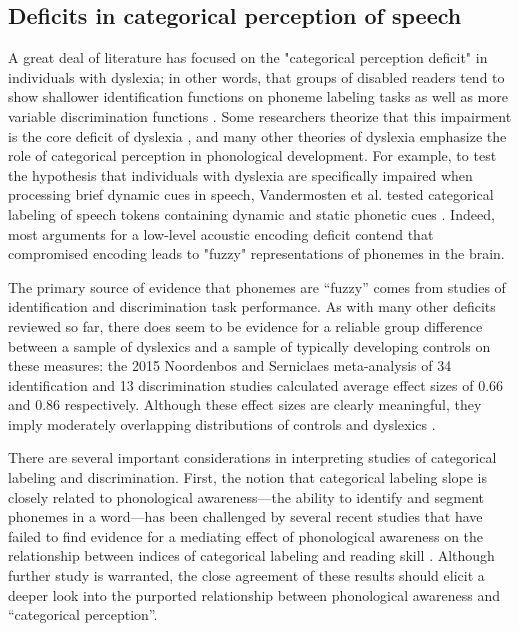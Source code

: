 \documentclass[../uwthesis.tex]{subfiles}
\begin{document}
\subsection{Deficits in categorical perception of speech}
A great deal of literature has focused on the "categorical perception deficit" in individuals with dyslexia; in other words, that groups of disabled readers tend to show shallower identification functions on phoneme labeling tasks as well as more variable discrimination functions \citep{Manis1997,Mody1997,Joanisse2000,Blomert2004,Hakvoort2016,Serniclaes2004}. Some researchers theorize that this impairment is the core deficit of dyslexia \citep{Serniclaes2001}, and many other theories of dyslexia emphasize the role of categorical perception in phonological development. For example, to test the hypothesis that individuals with dyslexia are specifically impaired when processing brief dynamic cues in speech, Vandermosten et al. tested categorical labeling of speech tokens containing dynamic and static phonetic cues \citep{Vandermosten2010,Vandermosten2011}. Indeed, most arguments for a low-level acoustic encoding deficit contend that compromised encoding leads to "fuzzy" representations of phonemes in the brain. 

The primary source of evidence that phonemes are “fuzzy” comes from studies of
identification and discrimination task performance. As with many other deficits reviewed so
far, there does seem to be evidence for a reliable group difference between a sample of
dyslexics and a sample of typically developing controls on these measures: the 2015
Noordenbos and Serniclaes meta-analysis of 34 identification and 13 discrimination studies calculated average effect sizes of 0.66 and 0.86 respectively. Although these effect sizes are
clearly meaningful, they imply moderately overlapping distributions of controls and
dyslexics \citep{Noordenbos2015}.

There are several important considerations in interpreting studies of
categorical labeling and discrimination. First, the notion that categorical labeling slope is
closely related to phonological awareness---the ability to identify and segment phonemes in
a word---has been challenged by several recent studies that have failed to find evidence for a
mediating effect of phonological awareness on the relationship between indices of
categorical labeling and reading skill \citep{Hakvoort2016,OBrien2018,Snowling2019LongitudinalDyslexia}. Although further
study is warranted, the close agreement of these results should elicit a deeper look into
the purported relationship between phonological awareness and “categorical perception”.
\end{document}
